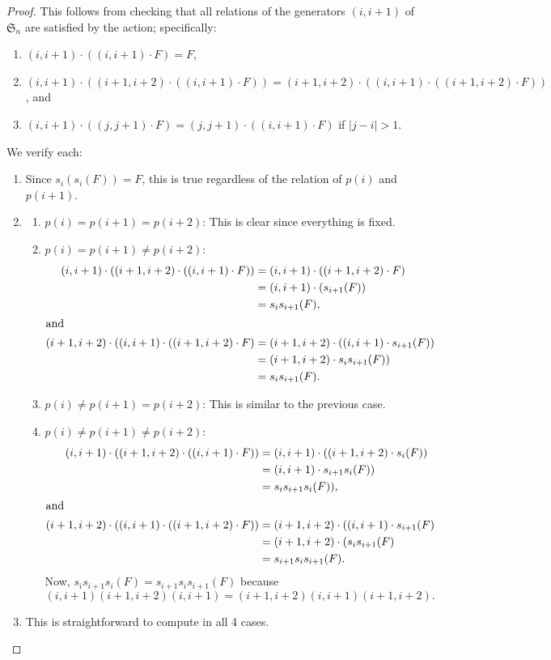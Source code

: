 \documentclass{amsart}
\renewcommand{\S}{\mathfrak{S}}
\theoremstyle{definition}
\begin{document}
\begin{proof}
    This follows from checking that all relations of the generators $(i,i+1)$ of $\S_n$ are satisfied by the action; specifically:
    \begin{enumerate}
    \item $ (i,i+1)\cdot ( (i,i+1)\cdot F)=F$,
    \item $ (i,i+1)\cdot ( (i+1,i+2)\cdot ( (i,i+1)\cdot F))= (i+1,i+2)\cdot ( (i,i+1)\cdot ( (i+1,i+2)\cdot F))$, and
    \item $(i,i+1)\cdot ((j,j+1)\cdot F)=(j,j+1)\cdot ((i,i+1)\cdot F)$ if $|j-i|>1$.
\end{enumerate}
We verify each:
\begin{enumerate}
    \item Since $s_i(s_i(F))=F$, this is true regardless of the relation of $p(i)$ and $p(i+1)$.
    \item 
\begin{enumerate}
    \item $p(i)=p(i+1)=p(i+2)$: This is clear since everything is fixed.
    \item $p(i)=p(i+1)\neq p(i+2)$: 
    \begin{align*}  
   (i,i+1)\cdot ( (i+1,i+2)\cdot ( (i,i+1)\cdot F))&=(i,i+1)\cdot ( (i+1,i+2) \cdot F)\\
   &=(i,i+1)\cdot ( s_{i+1}(F))\\
   &=s_is_{i+1}(F),\\
   \intertext{and}
    (i+1,i+2)\cdot ( (i,i+1)\cdot ( (i+1,i+2)\cdot F)&=(i+1,i+2)\cdot ( (i,i+1)\cdot s_{i+1}(F))\\
    &=(i+1,i+2)\cdot s_i s_{i+1}(F))\\
    &=s_is_{i+1}(F).\end{align*}
    \item  $p(i)\neq p(i+1)= p(i+2)$: This is similar to the previous case.
    \item $p(i)\neq p(i+1)\neq p(i+2)$:
    \begin{align*}(i,i+1)\cdot ( (i+1,i+2)\cdot ( (i,i+1)\cdot F))    &=(i,i+1)\cdot ( (i+1,i+2) \cdot s_i(F))\\
    &=(i,i+1)\cdot s_{i+1} s_i(F))\\
    &=s_i s_{i+1} s_i(F)),\\
    \intertext{and}
        (i+1,i+2)\cdot ( (i,i+1)\cdot ( (i+1,i+2)\cdot F))&=(i+1,i+2)\cdot ( (i,i+1)\cdot s_{i+1}(F)\\
        &=(i+1,i+2)\cdot (  s_is_{i+1}(F)\\
        &=s_{i+1} s_is_{i+1}(F).
    \end{align*}
    Now, $s_{i}s_{i+1}s_i(F)=s_{i+1}s_is_{i+1}(F)$ because \[(i,i+1)(i+1,i+2)(i,i+1)=(i+1,i+2)(i,i+1)(i+1,i+2).\]
\end{enumerate}
\item This is straightforward to compute in all 4 cases. \qedhere
\end{enumerate}
\end{proof}
\end{document}
